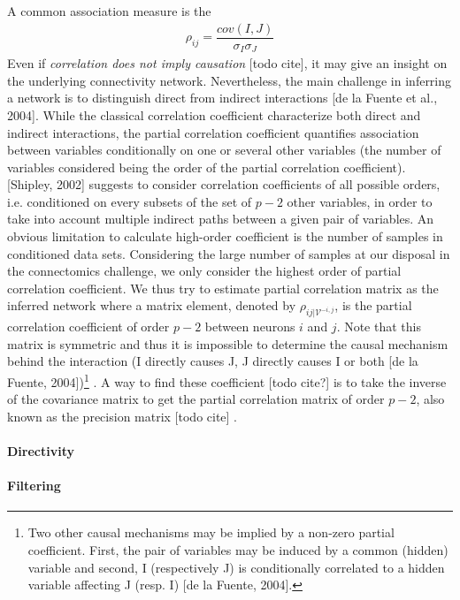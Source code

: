 \documentclass[wcp]{jmlr}
\begin{document}
A common association measure is the
\begin{align}
\rho_{ij} = \dfrac{cov(I,J)}{\sigma_I \sigma_J}
\end{align}
Even if \textit{correlation does not imply causation} [todo cite], it may give
an insight on the underlying connectivity network. Nevertheless, the main
challenge in inferring a network is to distinguish direct from indirect
interactions [de la Fuente et al., 2004]. While the classical correlation
coefficient characterize both direct and indirect interactions, the partial
correlation coefficient quantifies association between variables conditionally
on one or several other variables (the number of variables considered being
the order of the partial correlation coefficient). [Shipley, 2002] suggests to
consider correlation coefficients of all possible orders, i.e. conditioned
on every subsets of the set of $p-2$ other variables, in order to take into
account multiple indirect paths between a given pair of variables.  An obvious
limitation to calculate high-order coefficient is the number of samples in
conditioned data sets. Considering the large number of samples at our disposal
in the connectomics challenge, we only consider the highest order of partial
correlation coefficient. We thus try to estimate partial correlation matrix as
the inferred network where a matrix element, denoted by
$\rho_{ij | \mathcal{V}^{-i,j}}$, is the partial correlation coefficient of
order $p-2$ between neurons $i$ and $j$. Note that this matrix is symmetric
and thus it is impossible to determine the causal mechanism behind the
interaction (I directly causes J, J directly causes I or both
[de la Fuente, 2004])\footnote{Two other causal mechanisms may be implied
by a non-zero partial coefficient. First, the pair of variables may be induced
by a common (hidden) variable and second, I (respectively J) is conditionally
correlated to a hidden variable affecting J (resp. I) [de la Fuente, 2004].} .
A way to find these coefficient [todo cite?] is to take the inverse of the
covariance matrix to get the partial correlation matrix of order $p-2$, also
known as the precision matrix [todo cite] .

\paragraph{Directivity}

\paragraph{Filtering\\}
\end{document}
